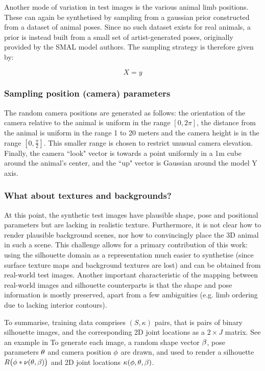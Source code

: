 Another mode of variation in test images is the various animal limb positions. These can again be synthetised by sampling from a gaussian prior constructed from a dataset of animal poses. Since no such dataset exists for real animals, a prior is instead built from a small set of artist-generated poses, originally provided by the SMAL model authors. The sampling strategy is therefore given by:


\begin{equation}\label{eq:sampling_pose}
    X = y
\end{equation}


\subsubsection{Sampling position (camera) parameters}

The random camera positions are generated as follows: the orientation of the camera relative to the animal is uniform in the range $[0, 2\pi]$, the distance from the animal is uniform in the range 1 to 20 meters and the camera height is in the range $[0,\frac{\pi}{2}]$. This smaller range is chosen to restrict unusual camera elevation. Finally, the camera ``look" vector is towards a point uniformly in a 1m cube around the animal's center, and the ``up" vector is Gaussian around the model Y axis.

\subsubsection{What about textures and backgrounds?} 

At this point, the synthetic test images have plausible shape, pose and positional parameters but are lacking in realistic texture. Furthermore, it is not clear how to render plausible background scenes, nor how to convincingly place the 3D animal in such a scene. This challenge allows for a primary contribution of this work: using the silhouette domain as a representation much easier to synthetise (since surface texture maps and background textures are lost) and can be obtained from real-world test images. Another important characteristic of the mapping between real-world images and silhouette counterparts is that the shape and pose information is mostly preserved, apart from a few ambiguities (e.g. limb ordering due to lacking interior contours). 

To summarise, training data comprises $(S, \kappa)$ pairs, that is pairs of binary silhouette images, and the corresponding 2D joint locations as a $2\times J$ matrix. See an example in   To generate each image, a random shape vector $\beta$, pose parameters $\theta$ and camera position $\phi$ are drawn, and used to render a silhouette $R\bigl(\phi * \nu(\theta, \beta)\bigr)$ and 2D joint locations $\kappa(\phi,\theta,\beta)$.


